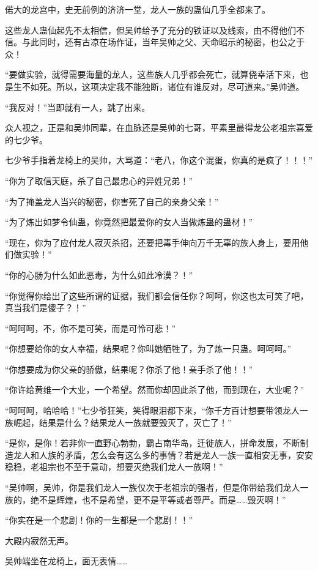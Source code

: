 \begin{this_body}
偌大的龙宫中，史无前例的济济一堂，龙人一族的蛊仙几乎全都来了。

这些龙人蛊仙起先不太相信，但吴帅给予了充分的铁证以及线索，由不得他们不信。与此同时，还有古凉在场作证，当年吴帅之父、天命昭示的秘密，也公之于众！

“要做实验，就得需要海量的龙人，这些族人几乎都会死亡，就算侥幸活下来，也是生不如死。所以，这项决定我不能独断，诸位有谁反对，尽可道来。”吴帅道。

“我反对！”当即就有一人，跳了出来。

众人视之，正是和吴帅同辈，在血脉还是吴帅的七哥，平素里最得龙公老祖宗喜爱的七少爷。

七少爷手指着龙椅上的吴帅，大骂道：“老八，你这个混蛋，你真的是疯了！！！”

“你为了取信天庭，杀了自己最忠心的异姓兄弟！”

“为了掩盖龙人当兴的秘密，你害死了自己的亲身父亲！”

“为了炼出如梦令仙蛊，你竟然把最爱你的女人当做炼蛊的蛊材！”

“现在，你为了应付龙人寂灭杀招，还要把毒手伸向万千无辜的族人身上，要用他们做实验！”

“你的心肠为什么如此恶毒，为什么如此冷漠？！”

“你觉得你给出了这些所谓的证据，我们都会信任你？呵呵，你这也太可笑了吧，真当我们是傻子？！”

“呵呵呵，不，你不是可笑，而是可怜可悲！”

“你想要给你的女人幸福，结果呢？你叫她牺牲了，为了炼一只蛊。呵呵呵。”

“你想要成为你父亲的骄傲，结果呢？你杀了他！亲手杀了他！！”

“你许给黄维一个大业，一个希望。然而你却因此杀了他，而到现在，大业呢？”

“呵呵呵，哈哈哈！”七少爷狂笑，笑得眼泪都下来，“你千方百计想要带领龙人一族崛起，结果是什么？结果龙人一族就要毁灭了，灭亡了！”

“是你，是你！若非你一直野心勃勃，霸占南华岛，迁徙族人，拼命发展，不断制造龙人和人族的矛盾，怎么会有这么多的事情？若是龙人一族一直相安无事，安安稳稳，老祖宗也不至于意动，想要灭绝我们龙人一族啊！”

“吴帅啊，吴帅，你是我们龙人一族仅次于老祖宗的强者，但是你带给我们龙人一族的，绝不是辉煌，也不是希望，更不是平等或者尊严。而是……毁灭啊！”

“你实在是一个悲剧！你的一生都是一个悲剧！！”

大殿内寂然无声。

吴帅端坐在龙椅上，面无表情……


\end{this_body}
